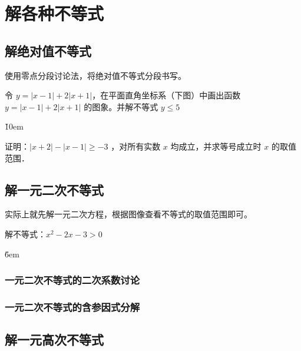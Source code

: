 \section{解各种不等式}

\subsection{解绝对值不等式}

\begin{theorem}[绝对值不等式]
    使用零点分段讨论法，将绝对值不等式分段书写。
\end{theorem}

\begin{example}
    令 $y=|x-1|+2|x+1|$，在平面直角坐标系（下图）中画出函数 $y=|x-1|+2|x+1|$ 的图象。并解不等式 $y \leq 5$
\end{example}

\v{10em}

\begin{example}
    证明：$|x+2|-|x-1| \geq-3$ ，对所有实数 $x$ 均成立，并求等号成立时 $x$ 的取值范围．
\end{example}

\vspace{10em}

\subsection{解一元二次不等式}

\begin{theorem}[一元二次不等式]
    实际上就先解一元二次方程，根据图像查看不等式的取值范围即可。
\end{theorem}

\begin{example}
    解不等式：$x^2-2x-3>0$
\end{example}

\v{6em}

\subsubsection{一元二次不等式的二次系数讨论}

\begin{theorem}[二次系数讨论]

\end{theorem}

\subsubsection{一元二次不等式的含参因式分解}

\begin{theorem}[]

\end{theorem}

\subsubsection{}

\subsection{解一元高次不等式}

\begin{theorem}[数轴穿根法]

\end{theorem}